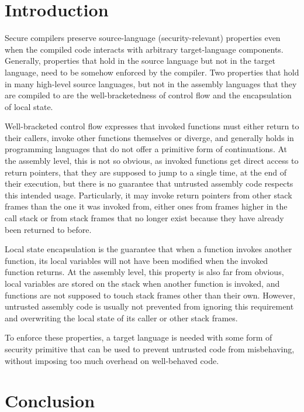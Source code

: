 \documentclass[sigplan, review]{acmart}
\begin{document}



\maketitle

\section{Introduction}
Secure compilers preserve source-language (security-relevant) properties even when the  compiled code interacts with arbitrary target-language components.
Generally, properties that hold in the source language but not in the target language, need to be somehow enforced by the compiler.
Two properties that hold in many high-level source languages, but not in the assembly languages that they are compiled to are the well-bracketedness of control flow and the encapsulation of local state.

Well-bracketed control flow expresses that invoked functions must either return to their callers, invoke other functions themselves or diverge, and generally holds in programming languages that do not offer a primitive form of continuations. 
At the assembly level, this is not so obvious, as invoked functions get direct access to return pointers, that they are supposed to jump to a single time, at the end of their execution, but there is no guarantee that untrusted assembly code respects this intended usage.
Particularly, it may invoke return pointers from other stack frames than the one it was invoked from, either ones from frames higher in the call stack or from stack frames that no longer exist because they have already been returned to before. 

Local state encapsulation is the guarantee that when a function invokes another function, its local variables will not have been modified when the invoked function returns.
At the assembly level, this property is also far from obvious, local variables are stored on the stack when another function is invoked, and functions are not supposed to touch stack frames other than their own.
However, untrusted assembly code is usually not prevented from ignoring this requirement and overwriting the local state of its caller or other stack frames.

To enforce these properties, a target language is needed with some form of security primitive that can be used to prevent untrusted code from misbehaving, without imposing too much overhead on well-behaved code.


\section{Conclusion}


 
\end{document}
